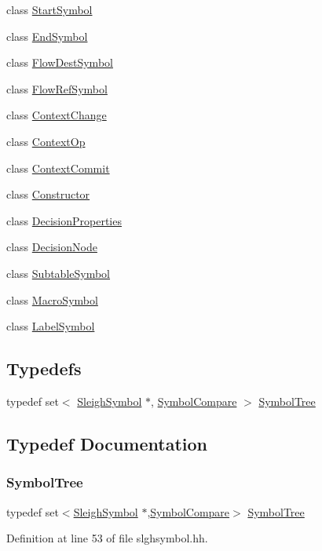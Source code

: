 \begin{DoxyCompactItemize}
class \mbox{\hyperlink{class_start_symbol}{Start\+Symbol}}
\item 
class \mbox{\hyperlink{class_end_symbol}{End\+Symbol}}
\item 
class \mbox{\hyperlink{class_flow_dest_symbol}{Flow\+Dest\+Symbol}}
\item 
class \mbox{\hyperlink{class_flow_ref_symbol}{Flow\+Ref\+Symbol}}
\item 
class \mbox{\hyperlink{class_context_change}{Context\+Change}}
\item 
class \mbox{\hyperlink{class_context_op}{Context\+Op}}
\item 
class \mbox{\hyperlink{class_context_commit}{Context\+Commit}}
\item 
class \mbox{\hyperlink{class_constructor}{Constructor}}
\item 
class \mbox{\hyperlink{class_decision_properties}{Decision\+Properties}}
\item 
class \mbox{\hyperlink{class_decision_node}{Decision\+Node}}
\item 
class \mbox{\hyperlink{class_subtable_symbol}{Subtable\+Symbol}}
\item 
class \mbox{\hyperlink{class_macro_symbol}{Macro\+Symbol}}
\item 
class \mbox{\hyperlink{class_label_symbol}{Label\+Symbol}}
\end{DoxyCompactItemize}
\subsection*{Typedefs}
\begin{DoxyCompactItemize}
\item 
typedef set$<$ \mbox{\hyperlink{class_sleigh_symbol}{Sleigh\+Symbol}} $\ast$, \mbox{\hyperlink{struct_symbol_compare}{Symbol\+Compare}} $>$ \mbox{\hyperlink{slghsymbol_8hh_a9ca3c9254ec7640aa6e290eecc4148e9}{Symbol\+Tree}}
\end{DoxyCompactItemize}


\subsection{Typedef Documentation}
\mbox{\label{slghsymbol_8hh_a9ca3c9254ec7640aa6e290eecc4148e9}} 
\subsubsection{\texorpdfstring{SymbolTree}{SymbolTree}}
{\footnotesize\ttfamily typedef set$<$\mbox{\hyperlink{class_sleigh_symbol}{Sleigh\+Symbol}} $\ast$,\mbox{\hyperlink{struct_symbol_compare}{Symbol\+Compare}}$>$ \mbox{\hyperlink{slghsymbol_8hh_a9ca3c9254ec7640aa6e290eecc4148e9}{Symbol\+Tree}}}



Definition at line 53 of file slghsymbol.\+hh.

